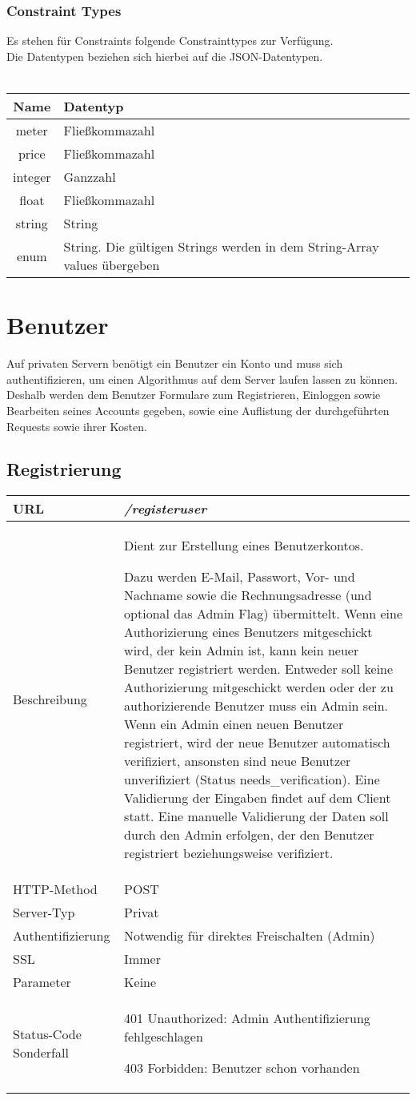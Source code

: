 \documentclass[ngerman,titlepage,parskip=true]{scrartcl}
\newcommand{\requestURL}[1]{\textit{#1}}
\newcommand{\request}[9]
{\subsection{#1}
\begin{tabular}{|p{0.2\textwidth}|p{0.7\textwidth}|}
\hline
  URL & \requestURL{#2}\\\hline
    Beschreibung & #3\\\hline
  HTTP-Method & #4\\\hline
  Server-Typ & #5\\\hline
  Authentifizierung & #6\\\hline
  SSL & #7\\\hline
  Parameter & #8\\\hline
  Status-Code Sonderfall & #9\\\hline
 \end{tabular}\vspace*{1em}}
{}%
{}%
{}%
{}%
{}%
{}%
{}%
{}%
\begin{document}
   	\subsubsection*{Constraint Types}
   	Es stehen für Constraints folgende Constrainttypes zur Verfügung.\\
   	Die Datentypen beziehen sich hierbei auf die JSON-Datentypen.\\
   	\\
   	 \noindent \begin{tabular}{|c|p{7.5cm}|}
    	\hline
    	\textbf{Name} & \textbf{Datentyp} \\ 
    	\hline \hline
    	
    	meter & Fließkommazahl \\ 
    	\hline
    	
    	price & Fließkommazahl \\
    	\hline
    	
    	integer & Ganzzahl \\
    	\hline
    	
    	float & Fließkommazahl \\
    	\hline
    	
    	string & String \\
    	\hline
    	
    	enum & String. Die gültigen Strings werden in dem String-Array values übergeben \\
    	\hline
    	\end{tabular}
   	\clearpage
\section{Benutzer}

Auf privaten Servern benötigt ein Benutzer ein Konto und muss sich authentifizieren, um einen Algorithmus auf dem Server laufen lassen zu können.
Deshalb werden dem Benutzer Formulare zum Registrieren, Einloggen sowie Bearbeiten seines Accounts gegeben, sowie eine Auflistung der durchgeführten Requests sowie ihrer Kosten.

\request{Registrierung}%
{/registeruser}%
{Dient zur Erstellung eines Benutzerkontos.\par Dazu werden E-Mail, Passwort, Vor- und Nachname sowie die Rechnungsadresse (und optional das Admin Flag) übermittelt. Wenn eine Authorizierung eines Benutzers mitgeschickt wird, der kein Admin ist, kann kein neuer Benutzer registriert werden. Entweder soll keine Authorizierung mitgeschickt werden oder der zu authorizierende Benutzer muss ein Admin sein. Wenn ein Admin einen neuen Benutzer registriert, wird der neue Benutzer automatisch verifiziert, ansonsten sind neue Benutzer unverifiziert (Status needs{\_}verification).
Eine Validierung der Eingaben findet auf dem Client statt. Eine manuelle Validierung der Daten soll durch den Admin erfolgen, der den Benutzer registriert beziehungsweise verifiziert.}%
{POST}%
{Privat}
{Notwendig für direktes Freischalten (Admin)}%
{Immer}%
{Keine}%
{401 Unauthorized: Admin Authentifizierung fehlgeschlagen \par 403 Forbidden: Benutzer schon vorhanden}%
		
\end{document}
